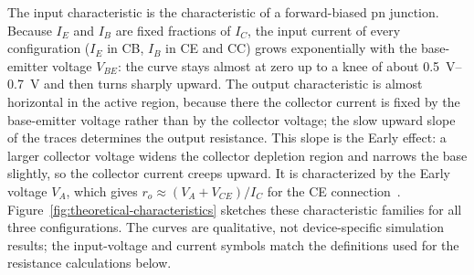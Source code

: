 \documentclass[12pt,a4paper]{article}
\begin{document}
	The input characteristic is the characteristic of a forward-biased pn
	junction. Because $I_E$ and $I_B$ are fixed fractions of $I_C$, the input
	current of every configuration ($I_E$ in CB, $I_B$ in CE and CC) grows
	exponentially with the base-emitter voltage $V_{BE}$: the curve stays
	almost at zero up to a knee of about \SIrange{0.5}{0.7}{\volt} and then
	turns sharply upward. The output characteristic is almost horizontal in
	the active region, because there the collector current is fixed by the
	base-emitter voltage rather than by the collector voltage; the slow upward
	slope of the traces determines the output resistance. This slope is the
	Early effect: a larger collector voltage widens the collector depletion
	region and narrows the base slightly, so the collector current creeps
	upward. It is characterized by the Early voltage $V_A$, which gives
	$r_o \approx (V_A + V_{CE})/I_C$ for the CE connection~\cite{ref:sedra}.
	Figure~\ref{fig:theoretical-characteristics} sketches these characteristic
	families for all three configurations. The curves are qualitative, not
	device-specific simulation results; the input-voltage and current symbols
	match the definitions used for the resistance calculations below.
\end{document}
